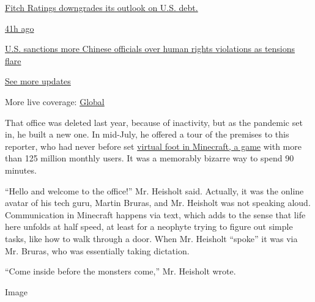 \href{https://www.nytimes.com/live/2020/07/31/business/stock-market-today-coronavirus?action=click\&pgtype=Article\&state=default\&region=MAIN_CONTENT_1\&context=storylines_live_updates\#fitch-ratings-downgrades-its-outlook-on-us-debt}{Fitch
Ratings downgrades its outlook on U.S. debt.}

\href{https://www.nytimes.com/live/2020/07/31/business/stock-market-today-coronavirus?action=click\&pgtype=Article\&state=default\&region=MAIN_CONTENT_1\&context=storylines_live_updates\#us-sanctions-more-chinese-officials-over-human-rights-violations-as-tensions-flare}{41h
ago}

\href{https://www.nytimes.com/live/2020/07/31/business/stock-market-today-coronavirus?action=click\&pgtype=Article\&state=default\&region=MAIN_CONTENT_1\&context=storylines_live_updates\#us-sanctions-more-chinese-officials-over-human-rights-violations-as-tensions-flare}{U.S.
sanctions more Chinese officials over human rights violations as
tensions flare}

\href{https://www.nytimes.com/live/2020/07/31/business/stock-market-today-coronavirus?action=click\&pgtype=Article\&state=default\&region=MAIN_CONTENT_1\&context=storylines_live_updates}{See
more updates}

More live coverage:
\href{https://www.nytimes.com/2020/08/01/world/coronavirus-covid-19.html?action=click\&pgtype=Article\&state=default\&region=MAIN_CONTENT_1\&context=storylines_live_updates}{Global}

That office was deleted last year, because of inactivity, but as the
pandemic set in, he built a new one. In mid-July, he offered a tour of
the premises to this reporter, who had never before set
\href{https://www.nytimes.com/2016/04/17/magazine/the-minecraft-generation.html}{virtual
foot in Minecraft, a game} with more than 125 million monthly users. It
was a memorably bizarre way to spend 90 minutes.

``Hello and welcome to the office!'' Mr. Heisholt said. Actually, it was
the online avatar of his tech guru, Martin Bruras, and Mr. Heisholt was
not speaking aloud. Communication in Minecraft happens via text, which
adds to the sense that life here unfolds at half speed, at least for a
neophyte trying to figure out simple tasks, like how to walk through a
door. When Mr. Heisholt ``spoke'' it was via Mr. Bruras, who was
essentially taking dictation.

``Come inside before the monsters come,'' Mr. Heisholt wrote.

Image

